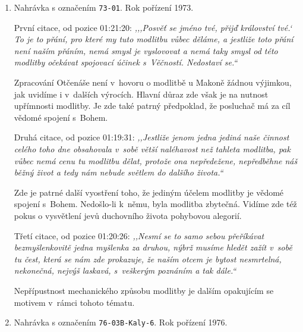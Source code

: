 \begin{enumerate}
  \item{
    Nahrávka s označením \texttt{73-01}.
    Rok pořízení 1973.

    První citace, od pozice 01:21:20: \textit{%
      ,,{},Posvěť se jméno tvé, přijď království tvé.` To je to přání, pro které
      my tuto modlitbu vůbec děláme, a jestliže toto přání není naším přáním,
      nemá smysl je vyslovovat a nemá taky smysl od této modlitby očekávat
      spojovací účinek s~Věčností. Nedostaví se.``
    }

    Zpracování Otčenáše není v~hovoru o modlitbě u Makoně žádnou výjimkou, jak
    uvidíme i v~dalších výrocích. Hlavní důraz zde však je na nutnost upřímnosti
    modlitby. Je zde také patrný předpoklad, že posluchač má za cíl vědomé
    spojení s~Bohem.

    Druhá citace, od pozice 01:19:31: \textit{%
      ,,Jestliže jenom jedna jediná naše činnost celého toho dne obsahovala v~sobě
      větší naléhavost než tahleta modlitba, pak vůbec nemá cenu tu modlitbu
      dělat, protože ona nepředežene, nepředběhne náš běžný život a tedy nám
      nebude světlem do dalšího života.``
    }

    Zde je patrné další vyostření toho, že jediným účelem modlitby je vědomé
    spojení s~Bohem. Nedošlo-li k~němu, byla modlitba zbytečná. Vidíme zde též
    pokus o vysvětlení jevů duchovního života pohybovou alegorií.

    Třetí citace, od pozice 01:20:26: \textit{%
      ,,Nesmí se to samo sebou přeříkávat bezmyšlenkovitě jedna myšlenka za
      druhou, nýbrž musíme hledět zažít v~sobě tu čest, která se nám zde
      prokazuje, že naším otcem je bytost nesmrtelná, nekonečná, nejvýš laskavá,
      s~veškerým poznáním a tak dále.``
    }

    Nepřípustnost mechanického způsobu modlitby je dalším opakujícím se motivem
    v~rámci tohoto tématu.
  }
  \item{
    Nahrávka s označením \texttt{76-03B-Kaly-6}.
    Rok pořízení 1976.

}
\end{enumerate}
